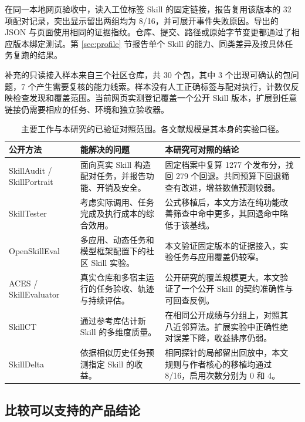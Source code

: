 \documentclass[final,5p,twocolumn,10pt]{elsarticle}
\begin{document}
在同一本地网页验收中，读入工位标签 Skill 的固定链接，报告复用该版本的 32 项配对记录，突出显示留出两组均为 8/16，并可展开事件失败原因。导出的 JSON 与页面使用相同的证据指纹。仓库、提交、路径或原始字节变更都通过了相应版本绑定测试。第 \ref{sec:profile} 节报告单个 Skill 的能力、同类差异及按具体任务复跑的结果。

补充的只读接入样本来自三个社区仓库，共 30 个包，其中 3 个出现可确认的包问题，7 个产生需要复核的能力线索。样本没有人工正确标签与配对执行，计数仅反映检查发现和覆盖范围。当前网页实测登记覆盖一个公开 Skill 版本，扩展到任意链接仍需要相应的任务、环境和独立验收器。

\begin{table}[!t]
\centering\small
\caption{主要工作与本研究的已验证对照范围。各文献规模是其本身的实验口径。}
\label{tab:related-scope}
\begin{tabularx}{\textwidth}{@{}p{}YY@{}}
\toprule
公开方法 & 能解决的问题 & 本研究可对照的结论 \\
\midrule
SkillAudit / SkillPortrait\cite{audit,portrait} & 面向真实 Skill 构造配对任务，并报告功能、开销及安全。 & 固定档案中复算 1277 个发布分，找回 279 个回退。共同预算下回退筛查有改进，增益数值预测较弱。 \\
SkillTester\cite{tester,testerspec} & 考虑实际调用、任务完成及执行成本的综合效用。 & 公式移植后，本文方法在纯功能改善筛查中命中更多，其回退命中略低于该基线。 \\
OpenSkillEval\cite{open} & 多应用、动态任务和模型框架配置下的社区 Skill 实验。 & 本文验证固定版本的证据接入，实验任务与应用覆盖仍较窄。 \\
ACES / SkillEvaluator\cite{aces,nvidia} & 真实仓库和多宿主运行的任务验收、轨迹与持续评估。 & 公开研究的覆盖规模更大。本文验证了一个公开 Skill 的契约准确性与可回查反例。 \\
SkillCT\cite{skillct} & 通过参考库估计新 Skill 的多维度质量。 & 在相同公开成绩与分组上，对照其八近邻算法。扩展实验中正确性绝对误差下降，收益排序仍弱。 \\
SkillDelta\cite{delta,deltacode} & 依据相似历史任务预测指定 Skill 的收益。 & 相同探针的局部留出回放中，本文规则与作者核心的移植均通过 8/16，启用次数分别为 0 和 4。 \\
\bottomrule
\end{tabularx}
\end{table}

\subsection{比较可以支持的产品结论}
\end{document}

